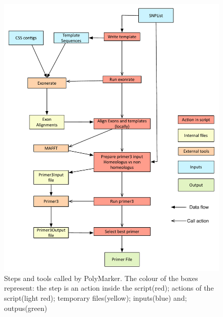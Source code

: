 \begin{figure}
\includegraphics[width=1\textwidth]{PolyMarker/Figures/pipeline.pdf}
\caption{Steps and tools called by PolyMarker. The colour of the boxes represent: the step is an action inside the script(red); actions of the script(light red); temporary files(yellow); inputs(blue) and; outpus(green)}
\label{fig:poly:pipeline}
\end{figure}


